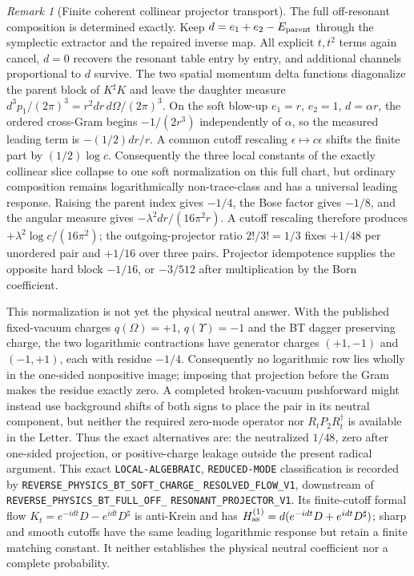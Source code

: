 \documentclass[11pt]{article}
\theoremstyle{definition}
\theoremstyle{remark}
\newtheorem{remark}[theorem]{Remark}
\begin{document}
\begin{remark}[Finite coherent collinear projector transport]
The full off-resonant composition is determined exactly.  Keep
$d=e_1+e_2-E_{\rm parent}$ through the symplectic extractor and the repaired
inverse map.  All explicit $t,t^2$ terms again cancel, $d=0$ recovers the
resonant table entry by entry, and additional channels proportional to $d$
survive.  The two spatial momentum delta functions diagonalize the parent
block of $K^\sharp K$ and leave the daughter measure
$d^3p_1/(2\pi)^3=r^2dr\,d\Omega/(2\pi)^3$.  On the soft blow-up
$e_1=r$, $e_2=1$, $d=\alpha r$, the ordered cross-Gram begins
$-1/(2r^3)$ independently of $\alpha$, so the measured leading term is
$-(1/2)dr/r$.  A common cutoff rescaling $\epsilon\mapsto c\epsilon$ shifts
the finite part by $(1/2)\log c$.  Consequently the three local constants of
the exactly collinear slice collapse to one soft normalization on this full
chart, but ordinary composition remains logarithmically non-trace-class and
has a universal leading response.  Raising the parent index gives $-1/4$,
the Bose factor gives $-1/8$, and the angular measure gives
$-\lambda^2dr/(16\pi^2r)$.  A cutoff rescaling therefore produces
$+\lambda^2\log c/(16\pi^2)$; the outgoing-projector ratio $2!/3!=1/3$
fixes $+1/48$ per unordered pair and $+1/16$ over three pairs.  Projector
idempotence supplies the opposite hard block $-1/16$, or $-3/512$ after
multiplication by the Born coefficient.

This normalization is not yet the physical neutral answer.  With the
published fixed-vacuum charges $q(\Omega)=+1$, $q(\Upsilon)=-1$ and the BT
dagger preserving charge, the two logarithmic contractions have generator
charges $(+1,-1)$ and $(-1,+1)$, each with residue $-1/4$.  Consequently no
logarithmic row lies wholly in the one-sided nonpositive image; imposing that
projection before the Gram makes the residue exactly zero.  A completed
broken-vacuum pushforward might instead use background shifts of both signs to
place the pair in its neutral component, but neither the required zero-mode
operator nor $R_tP_2R_t^\dagger$ is available in the Letter.  Thus the exact
alternatives are: the neutralized $1/48$, zero after one-sided projection, or
positive-charge leakage outside the present radical argument.  This exact
\texttt{LOCAL-ALGEBRAIC}, \texttt{REDUCED-MODE} classification is recorded by
\texttt{REVERSE\_PHYSICS\_BT\_SOFT\_CHARGE\_}
\allowbreak\texttt{RESOLVED\_FLOW\_V1}, downstream of
\texttt{REVERSE\_PHYSICS\_BT\_FULL\_OFF\_}
\allowbreak\texttt{RESONANT\_PROJECTOR\_V1}.  Its finite-cutoff formal flow
$K_t=e^{-idt}D-e^{idt}D^\sharp$ is anti-Krein and has
$H_{\rm as}^{(1)}=d(e^{-idt}D+e^{idt}D^\sharp)$; sharp and smooth cutoffs have
the same leading logarithmic response but retain a finite matching constant.
It neither establishes the physical neutral coefficient nor a complete
probability.


\end{remark}
\end{document}
